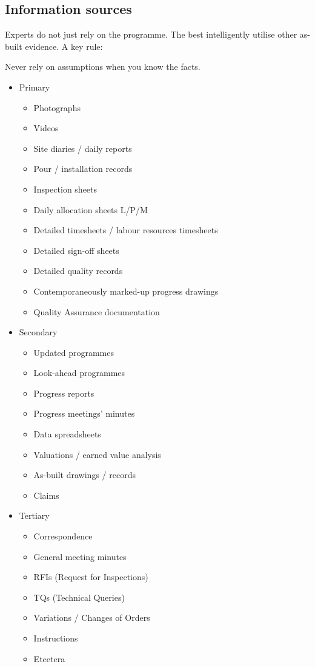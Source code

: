 \subsection{Information sources}
Experts do not just rely on the programme. The best intelligently utilise other as-built evidence. A key rule:
\begin{quoting}
    Never rely on assumptions when you know the facts.
\end{quoting}
\begin{itemize}
    \item Primary
          \begin{itemize}
              \item Photographs
              \item Videos
              \item Site diaries / daily reports
              \item Pour / installation records
              \item Inspection sheets
              \item Daily allocation sheets L/P/M
              \item Detailed timesheets / labour resources timesheets
              \item Detailed sign-off sheets
              \item Detailed quality records
              \item Contemporaneously marked-up progress drawings
              \item Quality Assurance documentation
          \end{itemize}
    \item Secondary
          \begin{itemize}
              \item Updated programmes
              \item Look-ahead programmes
              \item Progress reports
              \item Progress meetings' minutes
              \item Data spreadsheets
              \item Valuations / earned value analysis
              \item As-built drawings / records
              \item Claims
          \end{itemize}
    \item Tertiary
          \begin{itemize}
              \item Correspondence
              \item General meeting minutes
              \item RFIs (Request for Inspections)
              \item TQs (Technical Queries)
              \item Variations / Changes of Orders
              \item Instructions
              \item Etcetera
          \end{itemize}
\end{itemize}
